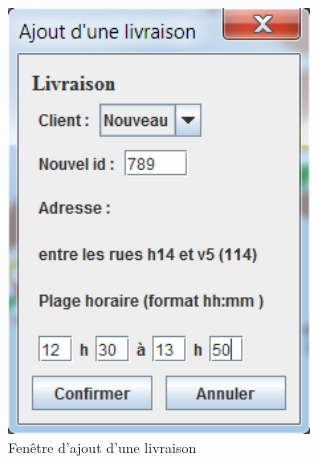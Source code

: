 \begin{figure}[h]
    \centering
    \includegraphics[width=80mm]{./images/screenshot3.png}
    \caption{Fenêtre d'ajout d'une livraison}
\end{figure}
\pagebreak

